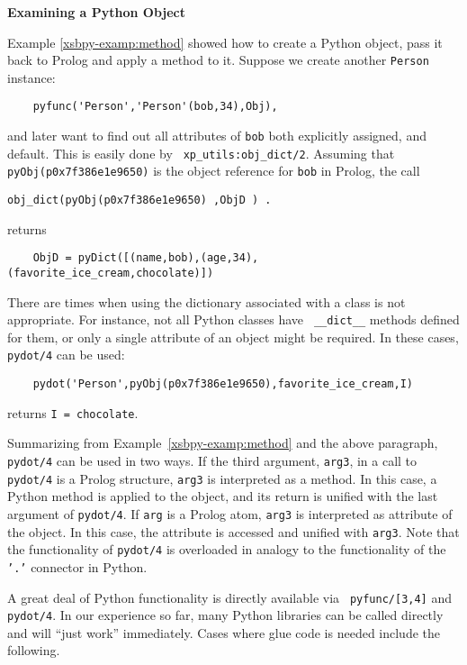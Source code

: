 \begin{example} \rm {\bf Examining a Python Object} \label{xsbpy-examp:exam-object}

\noindent
Example \ref{xsbpy-examp:method} showed how to create a Python object,
pass it back to Prolog and apply a method to it.  Suppose we create
another {\tt Person} instance:

\begin{verbatim}
    pyfunc('Person','Person'(bob,34),Obj),
\end{verbatim}
\noindent
and later want to find out all attributes of {\tt bob} both explicitly
assigned, and default.  This is easily done by {\tt
  xp\_utils:obj\_dict/2}.  Assuming that {\tt pyObj(p0x7f386e1e9650)}
is the object reference for {\tt bob} in Prolog, the call
\begin{verbatim}
obj_dict(pyObj(p0x7f386e1e9650) ,ObjD ) .
\end{verbatim}
returns
\begin{verbatim}
    ObjD = pyDict([(name,bob),(age,34),(favorite_ice_cream,chocolate)])
\end{verbatim}

There are times when using the dictionary associated with a class is
not appropriate.  For instance, not all Python classes have {\tt
  \_\_dict\_\_} methods defined for them, or only a single attribute
of an object might be required.  In these cases, {\tt pydot/4} can be
used:

\begin{verbatim}
    pydot('Person',pyObj(p0x7f386e1e9650),favorite_ice_cream,I)
\end{verbatim}
\noindent
returns {\tt I = chocolate}.

\noindent

Summarizing from Example~\ref{xsbpy-examp:method} and the above
paragraph, {\tt pydot/4} can be used in two ways.  If the third
argument, {\tt arg3}, in a call to {\tt pydot/4} is a Prolog
structure, {\tt arg3} is interpreted as a method.  In this case, a
Python method is applied to the object, and its return is unified with
the last argument of {\tt pydot/4}. If {\tt arg} is a Prolog atom,
{\tt arg3} is interpreted as attribute of the object.  In this case,
the attribute is accessed and unified with {\tt arg3}.  Note that the
functionality of {\tt pydot/4} is overloaded in analogy to the
functionality of the {\tt '.'} connector in Python.
\end{example}

A great deal of Python functionality is directly available via {\tt
  pyfunc/[3,4]} and {\tt pydot/4}.  In our experience so far, many
Python libraries can be called directly and will ``just work''
immediately.  Cases where glue code is needed include the following.

